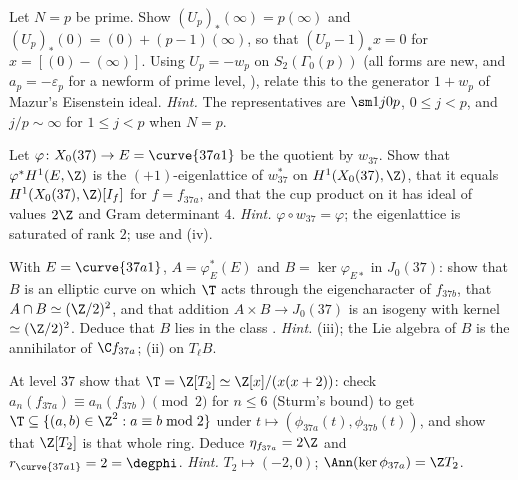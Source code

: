 \begin{exercise}\label{ex:moddeg:ex-up-cusp}
Let $N=p$ be prime. Show $(U_p)_*(\infty)=p(\infty)$ and $(U_p)_*(0)=(0)+(p-1)(\infty)$, so that $(U_p-1)_*x=0$ for $x=[(0)-(\infty)]$. Using $U_p=-w_p$ on $S_2(\Gamma_0(p))$ (all forms are new, and $a_p=-\varepsilon_p$ for a
newform of prime level, ), relate this to the generator $1+w_p$ of Mazur's Eisenstein ideal. \emph{Hint.} The representatives are $\sm1j0p$, $0\le j<p$, and $j/p\sim\infty$ for $1\le j<p$ when $N=p$.
\end{exercise}

\begin{exercise}\label{ex:moddeg:ex-37-lattice}
Let $\varphi\colon X_0(37)\to E=\curve{37a1}$ be the quotient by $w_{37}$. Show that $\varphi^*H^1(E,\Z)$ is the $(+1)$-eigenlattice of $w_{37}^*$ on $H^1(X_0(37),\Z)$, that it equals $H^1(X_0(37),\Z)[I_f]$ for $f=f_{37a}$,
and that the cup product on it has ideal of values $2\Z$ and Gram determinant $4$. \emph{Hint.} $\varphi\circ w_{37}=\varphi$; the eigenlattice is saturated of rank $2$; use  and
(iv).
\end{exercise}

\begin{exercise}\label{ex:moddeg:ex-j037}
With $E=\curve{37a1}$, $A=\varphi_E^*(E)$ and $B=\ker\varphi_{E*}$ in $J_0(37)$: show that $B$ is an elliptic curve on which $\T$ acts through the eigencharacter of $f_{37b}$, that $A\cap B\simeq(\Z/2)^2$, and that
addition $A\times B\to J_0(37)$ is an isogeny with kernel $\simeq(\Z/2)^2$. Deduce that $B$ lies in the class . \emph{Hint.} (iii); the Lie algebra of $B$ is the
annihilator of $\C f_{37a}$; (ii) on $T_\ell B$.
\end{exercise}

\begin{exercise}\label{ex:moddeg:ex-level37-hecke}
At level $37$ show that $\T=\Z[T_2]\simeq\Z[x]/(x(x+2))$: check $a_n(f_{37a})\equiv a_n(f_{37b})\pmod2$ for $n\le6$ (Sturm's bound) to get $\T\subseteq\{(a,b)\in\Z^2:a\equiv b\bmod2\}$ under
$t\mapsto(\phi_{37a}(t),\phi_{37b}(t))$, and show that $\Z[T_2]$ is that whole ring. Deduce $\eta_{f_{37a}}=2\Z$ and $r_{\curve{37a1}}=2=\degphi$. \emph{Hint.} $T_2\mapsto(-2,0)$; $\Ann(\ker\phi_{37a})=\Z T_2$.
\end{exercise}

